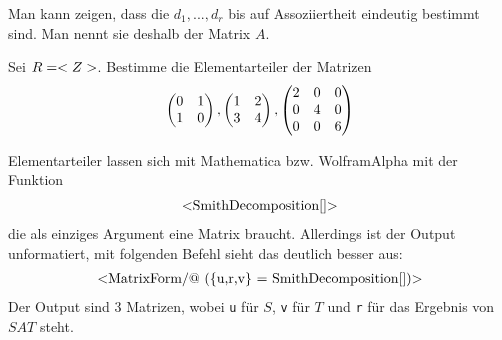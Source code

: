 \begin{remark}
	Man kann zeigen, dass die $d_1,...,d_r$ bis auf Assoziiertheit eindeutig bestimmt sind. Man nennt sie deshalb  der Matrix $A$.
\end{remark}

\begin{example}
	Sei $R=\whole$. Bestimme die Elementarteiler der Matrizen
	\begin{align}
		\begin{pmatrix}0&1\\1&0\end{pmatrix},\begin{pmatrix}1&2 \\ 3&4\end{pmatrix},\begin{pmatrix}2&0&0 \\ 0&4&0 \\0&0&6\end{pmatrix}\notag
	\end{align}
\end{example}

\begin{mathematica}
	Elementarteiler lassen sich mit Mathematica bzw. WolframAlpha mit der Funktion
	\begin{align}
		\text{\texttt{SmithDecomposition[]}}\notag
	\end{align}
	die als einziges Argument eine Matrix braucht. Allerdings ist der Output unformatiert, mit folgenden Befehl sieht das deutlich besser aus:
	\begin{align}
	\text{\texttt{MatrixForm/@ (\{u,r,v\} = SmithDecomposition[])}}\notag
	\end{align}
	Der Output sind 3 Matrizen, wobei \texttt{u} für $S$, \texttt{v} für $T$ und \texttt{r} für das Ergebnis von $SAT$ steht.
\end{mathematica}